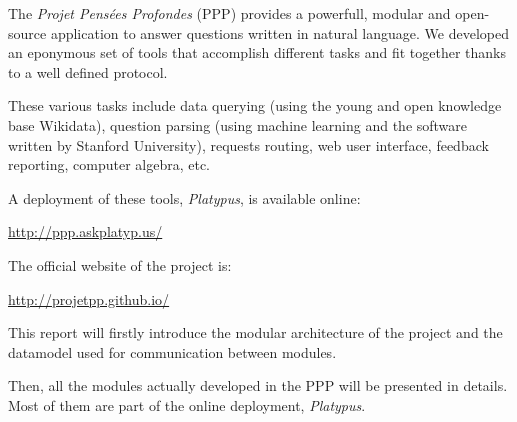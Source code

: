 The \emph{Projet Pensées Profondes} (PPP) provides a powerfull,
modular and open-source application to answer questions written in natural language.
We developed an eponymous set of tools that accomplish different tasks and fit
together thanks to a well defined protocol.

These various tasks include data querying (using the young and open
knowledge base Wikidata), question parsing (using machine learning and the
\CoreNLP software written by Stanford University),
requests routing, web user interface, feedback reporting, computer algebra, etc.

A deployment of these tools, \emph{Platypus}, is available online:

\begin{center}
    \url{http://ppp.askplatyp.us/}
\end{center}

The official website of the project is:

\begin{center}
    \url{http://projetpp.github.io/}
\end{center}

\medbreak

This report will firstly introduce the modular architecture of the
project and the datamodel used for communication between modules.

Then, all the modules actually developed in the PPP will be presented in details. Most of
them are part of the online deployment, \emph{Platypus}.

